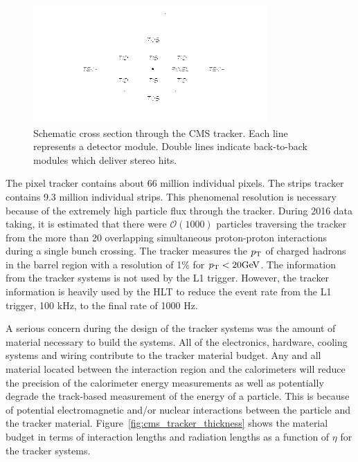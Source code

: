 \begin{figure}[htbp]
\centering
     \includegraphics[width=0.8\textwidth]{cms_and_lhc/plots/cms_tracker.png}
     \caption{
Schematic cross section through the CMS tracker. Each line represents a detector module. 
Double lines indicate back-to-back modules which deliver stereo hits.
     }
     \label{fig:cms_tracker}
\end{figure}

The pixel tracker contains about 66 million individual pixels. The strips tracker
contains 9.3 million individual strips. This phenomenal resolution is necessary
because of the extremely high particle flux through the tracker. During 2016 data
taking, it is estimated that there were $\mathcal{O}( 1000 )$ particles 
traversing the tracker from the more than 20 overlapping simultaneous proton-proton 
interactions during a single bunch crossing. The tracker measures the $p_\mathrm{T}$ of 
charged hadrons in the barrel region with a resolution of 1\% for $p_\mathrm{T} < 20\mathrm{GeV}$.
The information from the tracker systems is
not used by the L1 trigger. However, the tracker information is heavily used by the HLT to
reduce the event rate from the L1 trigger, 100 kHz, to the final rate of 1000 Hz.

A serious concern during the design of the tracker systems was the amount of
material necessary to build the systems. All of the electronics, hardware, 
cooling systems and wiring contribute to the tracker material budget. Any and all material
located between the interaction region and the calorimeters will reduce the precision 
of the calorimeter energy measurements as well as potentially degrade the track-based
measurement of the energy of a particle. This is because of potential electromagnetic
and/or nuclear interactions between the particle and the tracker material. Figure~\ref{fig:cms_tracker_thickness}
shows the material budget in terms of interaction lengths and radiation lengths as a function
of $\eta$ for the tracker systems.

